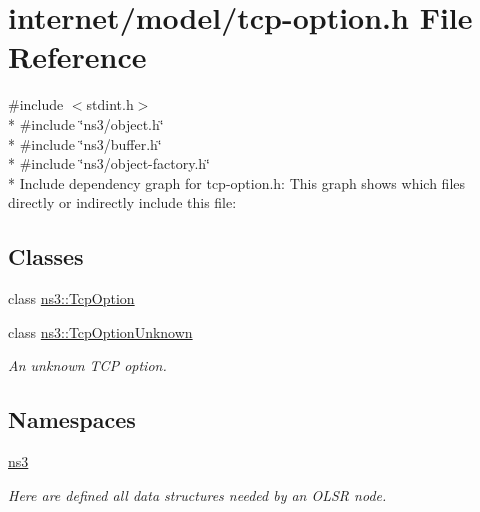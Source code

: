 \hypertarget{tcp-option_8h}{}\section{internet/model/tcp-\/option.h File Reference}
\label{tcp-option_8h}
{\ttfamily \#include $<$stdint.\+h$>$}\\*
{\ttfamily \#include \char`\"{}ns3/object.\+h\char`\"{}}\\*
{\ttfamily \#include \char`\"{}ns3/buffer.\+h\char`\"{}}\\*
{\ttfamily \#include \char`\"{}ns3/object-\/factory.\+h\char`\"{}}\\*
Include dependency graph for tcp-\/option.h\+:
This graph shows which files directly or indirectly include this file\+:
\subsection*{Classes}
\begin{DoxyCompactItemize}
\item 
class \hyperlink{classns3_1_1TcpOption}{ns3\+::\+Tcp\+Option}
\item 
class \hyperlink{classns3_1_1TcpOptionUnknown}{ns3\+::\+Tcp\+Option\+Unknown}
\begin{DoxyCompactList}\small\item\em An unknown T\+CP option. \end{DoxyCompactList}\end{DoxyCompactItemize}
\subsection*{Namespaces}
\begin{DoxyCompactItemize}
\item 
 \hyperlink{namespacens3}{ns3}
\begin{DoxyCompactList}\small\item\em Here are defined all data structures needed by an O\+L\+SR node. \end{DoxyCompactList}\end{DoxyCompactItemize}
